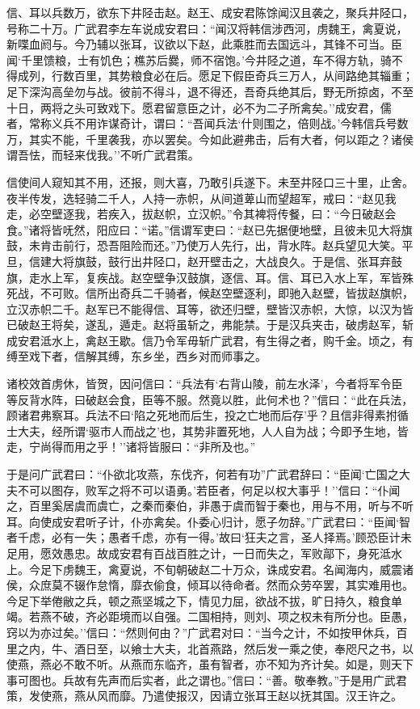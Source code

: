 \documentclass[]{article}
\begin{document}
信、耳以兵数万，欲东下井陉击赵。赵王、成安君陈馀闻汉且袭之，聚兵井陉口，号称二十万。广武君李左车说成安君曰：``闻汉将韩信涉西河，虏魏王，禽夏说，新喋血阏与。今乃辅以张耳，议欲以下赵，此乘胜而去国远斗，其锋不可当。臣闻`千里馈粮，士有饥色；樵苏后爨，师不宿饱。'今井陉之道，车不得方轨，骑不得成列，行数百里，其势粮食必在后。愿足下假臣奇兵三万人，从间路绝其辎重；足下深沟高垒勿与战。彼前不得斗，退不得还，吾奇兵绝其后，野无所掠卤，不至十日，两将之头可致戏下。愿君留意臣之计，必不为二子所禽矣。''成安君，儒者，常称义兵不用诈谋奇计，谓曰：``吾闻兵法`什则围之，倍则战。'今韩信兵号数万，其实不能，千里袭我，亦以罢矣。今如此避弗击，后有大者，何以距之？诸侯谓吾怯，而轻来伐我。''不听广武君策。

信使间人窥知其不用，还报，则大喜，乃敢引兵遂下。未至井陉口三十里，止舍。夜半传发，选轻骑二千人，人持一赤帜，从间道萆山而望超军，戒曰：``赵见我走，必空壁逐我，若疾入，拔赵帜，立汉帜。''令其裨将传餐，曰：``今日破赵会食。''诸将皆呒然，阳应曰：``诺。''信谓军吏曰：``赵已先据便地壁，且彼未见大将旗鼓，未肯击前行，恐吾阻险而还。''乃使万人先行，出，背水阵。赵兵望见大笑。平旦，信建大将旗鼓，鼓行出井陉口，赵开壁击之，大战良久。于是信、张耳弃鼓旗，走水上军，复疾战。赵空壁争汉鼓旗，逐信、耳。信、耳已入水上军，军皆殊死战，不可败。信所出奇兵二千骑者，候赵空壁逐利，即驰入赵壁，皆拔赵旗帜，立汉赤帜二千。赵军已不能得信、耳等，欲还归壁，壁皆汉赤帜，大惊，以汉为皆已破赵王将矣，遂乱，遁走。赵将虽斩之，弗能禁。于是汉兵夹击，破虏赵军，斩成安君泜水上，禽赵王歇。信乃令军毋斩广武君，有生得之者，购千金。顷之，有缚至戏下者，信解其缚，东乡坐，西乡对而师事之。

诸校效首虏休，皆贺，因问信曰：``兵法有`右背山陵，前左水泽'，今者将军令臣等反背水阵，曰破赵会食，臣等不服。然竟以胜，此何术也？''信曰：``此在兵法，顾诸君弗察耳。兵法不曰`陷之死地而后生，投之亡地而后存'乎？且信非得素拊循士大夫，经所谓`驱市人而战之'也，其势非置死地，人人自为战；今即予生地，皆走，宁尚得而用之乎！''诸将皆服曰：``非所及也。''

于是问广武君曰：``仆欲北攻燕，东伐齐，何若有功''广武君辞曰：``臣闻`亡国之大夫不可以图存，败军之将不可以语勇。'若臣者，何足以权大事乎！''信曰：``仆闻之，百里奚居虞而虞亡，之秦而秦伯，非愚于虞而智于秦也，用与不用，听与不听耳。向使成安君听子计，仆亦禽矣。仆委心归计，愿子勿辞。''广武君曰：``臣闻`智者千虑，必有一失；愚者千虑，亦有一得。'故曰`狂夫之言，圣人择焉。'顾恐臣计未足用，愿效愚忠。故成安君有百战百胜之计，一日而失之，军败鄗下，身死泜水上。今足下虏魏王，禽夏说，不旬朝破赵二十万众，诛成安君。名闻海内，威震诸侯，众庶莫不辍作怠惰，靡衣偷食，倾耳以待命者。然而众劳卒罢，其实难用也。今足下举倦敝之兵，顿之燕坚城之下，情见力屈，欲战不拔，旷日持久，粮食单竭。若燕不破，齐必距境而以自强。二国相持，则刘、项之权未有所分也。臣愚，窍以为亦过矣。''信曰：``然则何由？''广武君对曰：``当今之计，不如按甲休兵，百里之内，牛、酒日至，以飨士大夫，北首燕路，然后发一乘之使，奉咫尺之书，以使燕，燕必不敢不听。从燕而东临齐，虽有智者，亦不知为齐计矣。如是，则天下事可图也。兵故有先声而后实者，此之谓也。''信曰：``善。敬奉教。''于是用广武君策，发使燕，燕从风而靡。乃遣使报汉，因请立张耳王赵以抚其国。汉王许之。
\end{document}
